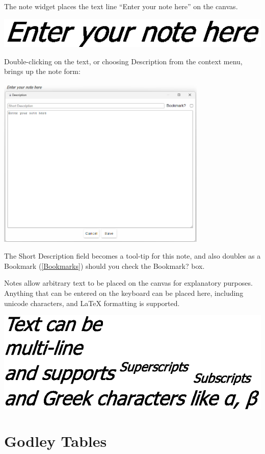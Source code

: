 The note widget places the text line ``Enter your note here'' on
the canvas.

\includegraphics{images/note}

Double-clicking on the text, or choosing Description from the context
menu, brings up the note form:

\includegraphics[width=10cm]{images/NoteWindow}

The Short Description field becomes a tool-tip for this note, and
also doubles as a Bookmark (\ref{Bookmarks}) should you check the
Bookmark? box. 

Notes allow arbitrary text to be placed on the canvas for explanatory
purposes. Anything that can be entered on the keyboard can be placed
here, including unicode characters, and LaTeX formatting is supported. 

\includegraphics{images/Note+Text}

\section{Godley Tables}

